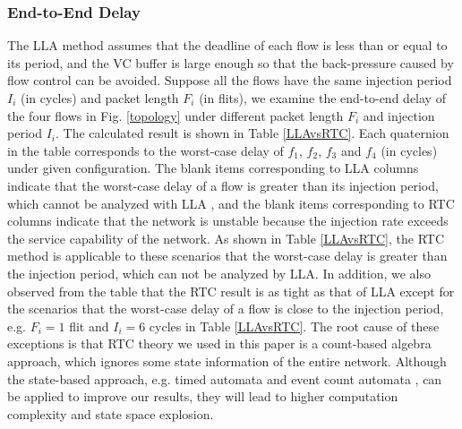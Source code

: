 \documentclass[preprint]{elsarticle}
\begin{document}
\subsubsection{End-to-End Delay}
The LLA method assumes that the deadline of each flow is less than or equal to its period, and the VC buffer is large enough so that the back-pressure caused by flow control can be avoided. Suppose all the flows have the same injection period $I_i$ (in cycles) and packet length $F_i$ (in flits), we examine the end-to-end delay of the four flows in Fig. \ref{topology} under different packet length $F_i$ and injection period $I_i$. The calculated result is shown in Table \ref{LLAvsRTC}. Each quaternion in the table corresponds to the worst-case delay of $f_1$, $f_2$, $f_3$ and $f_4$ (in cycles) under given configuration. The blank items corresponding to LLA columns indicate that the worst-case delay of a flow is greater than its injection period, which cannot be analyzed with LLA \cite{73}\cite{189}, and the blank items corresponding to RTC columns indicate that the network is unstable because the injection rate exceeds the service capability of the network. As shown in Table \ref{LLAvsRTC}, the RTC method is applicable to these scenarios that the worst-case delay is greater than the injection period, which can not be analyzed by LLA. In addition, we also observed from the table that the RTC result is as tight as that of LLA except for the scenarios that the worst-case delay of a flow is close to the injection period, e.g. $F_i=1$ flit and $I_i=6$ cycles in Table \ref{LLAvsRTC}. The root cause of these exceptions is that RTC theory we used in this paper is a count-based algebra approach, which ignores some state information of the entire network. Although the state-based approach, e.g. timed automata \cite{Fersman2006301} and event count automata \cite{Chakraborty:2005:ECA:1106608.1106642}, can be applied to improve our results, they will lead to higher computation complexity and state space explosion.
\end{document}
